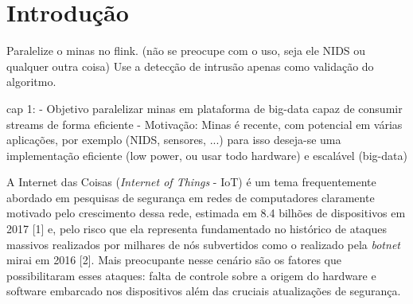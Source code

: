 
\chapter{Introdução}

Paralelize o minas no flink.
(não se preocupe com o uso, seja ele NIDS ou qualquer outra coisa)
Use a detecção de intrusão apenas como validação do algoritmo.


cap 1:
    - Objetivo paralelizar minas em plataforma de big-data capaz de consumir streams de forma eficiente
    - Motivação: Minas é recente, com potencial em várias aplicações, por exemplo (NIDS, sensores, ...)
        para isso deseja-se uma implementação eficiente (low power, ou usar todo hardware) e escalável (big-data)

A Internet das Coisas (\emph{Internet of Things} - IoT) é um tema frequentemente
abordado em pesquisas de segurança em redes de computadores claramente motivado
pelo crescimento dessa rede, estimada em 8.4 bilhões de dispositivos em 2017
[1] e, pelo risco que ela representa fundamentado no histórico de ataques
massivos realizados por milhares de nós subvertidos como o realizado pela \emph{botnet}
mirai em 2016 [2]. Mais preocupante nesse cenário são os fatores que
possibilitaram esses ataques: falta de controle sobre a origem do hardware e
software embarcado nos dispositivos além das cruciais atualizações de segurança.

